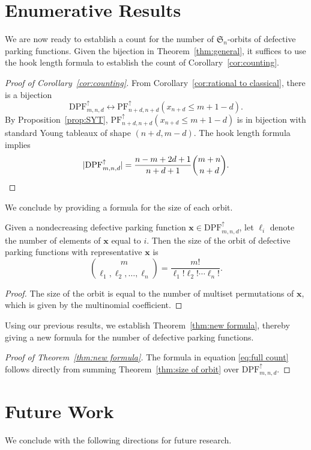 \documentclass[11pt,reqno]{BICA}
\theoremstyle{definition}
\newcommand{\Sym}{\mathfrak{S}}
\newcommand{\NDPF}{\mathrm{PF}^{\uparrow}}
\newcommand{\NDDPF}{\mathrm{DPF}^\uparrow}
\newcommand{\x}{\mathbf{x}}
\newcommand{\bij}{\longleftrightarrow}
\begin{document}
\section{Enumerative Results}\label{sec:enumerative}

We are now ready to establish a count for the number of $\Sym_n$-orbits of defective parking functions. Given the bijection in Theorem~\ref{thm:general}, it suffices to use  the hook length formula to establish the count of Corollary~\ref{cor:counting}.

\begin{proof}[Proof of Corollary~\ref{cor:counting}]
    From Corollary~\ref{cor:rational to classical}, there is a bijection \[\NDDPF_{m,n,d} \bij \NDPF_{n+d,n+d}(x_{n+d} \leq m+1-d).\]
    By Proposition~\ref{prop:SYT}, $\NDPF_{n+d,n+d}(x_{n+d} \leq m+1-d)$ is in bijection with standard Young tableaux of shape $(n+d,m-d)$. The hook length formula implies
    \[|\NDDPF_{m,n,d}| = \frac{n-m+2d+1}{n+d+1}\binom{m+n}{n+d}.\qedhere\]
\end{proof}

We conclude by providing a formula for the size of each orbit. 

\begin{theorem}\label{thm:size of orbit}
Given a nondecreasing defective parking function $\x \in \NDDPF_{m,n,d}$, let $\ell_i$ denote the number of elements of $\x$ equal to $i$. Then the size of the orbit of defective parking functions with representative $\x$ is
\[
\binom{m}{\ell_1,\ell_2,\ldots,\ell_{n}}=\frac{m!}{\ell_1!\ell_2!\cdots \ell_{n}!}.\] 
\end{theorem}
\begin{proof}
The size of the orbit is equal to the number of multiset permutations of $\x$, which is given by the multinomial coefficient.
\end{proof}

Using our previous results, we establish Theorem~\ref{thm:new formula}, thereby giving a new formula for the number of defective parking functions. 
\begin{proof}[Proof of Theorem~\ref{thm:new formula}]
    The formula in equation \eqref{eq:full count}  follows directly from summing Theorem~\ref{thm:size of orbit} over $\NDDPF_{m,n,d}$.
\end{proof}

\section{Future Work}
We conclude with the following directions for future research. 
\end{document}
